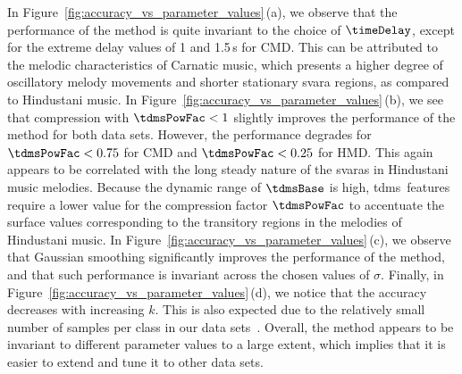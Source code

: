 In Figure~\ref{fig:accuracy_vs_parameter_values}\,(a), we observe that the performance of the method is quite invariant to the choice of $\timeDelay$, except for the extreme delay values of 1 and 1.5\,s for CMD. This can be attributed to the melodic characteristics of Carnatic music, which presents a higher degree of oscillatory melody movements and shorter stationary svara regions, as compared to Hindustani music. In Figure~\ref{fig:accuracy_vs_parameter_values}\,(b), we see that compression with $\tdmsPowFac < 1$ slightly improves the performance of the method for both data sets. However, the performance degrades for $\tdmsPowFac < 0.75$ for  CMD and $\tdmsPowFac < 0.25$ for  HMD. This again appears to be correlated with the long steady nature of the svaras in Hindustani music melodies. Because the dynamic range of $\tdmsBase$ is high, \gls{tdms}\ features require a lower value for the compression factor $\tdmsPowFac$ to accentuate the surface values corresponding to the transitory regions in the melodies of Hindustani music. In Figure~\ref{fig:accuracy_vs_parameter_values}\,(c), we observe that Gaussian smoothing significantly improves the performance of the method, and that such performance is invariant across the chosen values of $\sigma$. Finally, in Figure~\ref{fig:accuracy_vs_parameter_values}\,(d), we notice that the accuracy decreases with increasing $k$. This is also expected due to the relatively small number of samples per class in our data sets~\cite{Mitchell97BOOK}. %
Overall, the method appears to be invariant to different parameter values to a large extent, which implies that it is easier to extend and tune it to other data sets.

